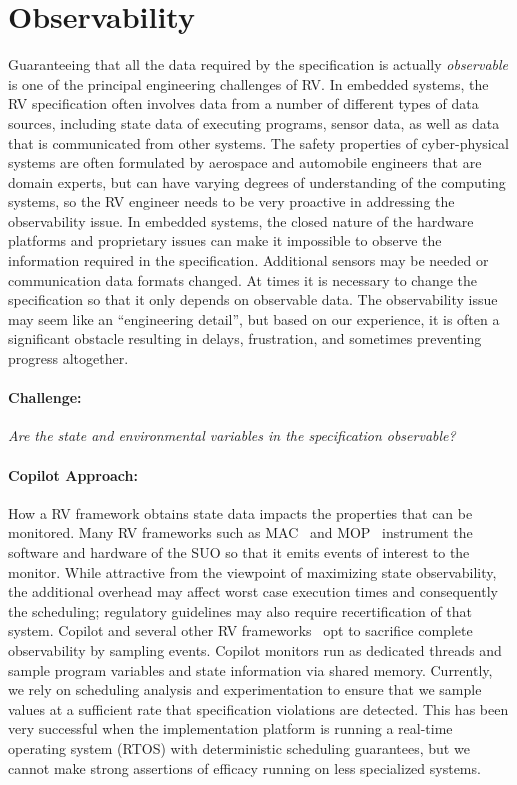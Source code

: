 \section{Observability}\label{sec:observ} 
Guaranteeing that all the data required by the specification is
actually \emph{observable} is one of the principal engineering
challenges of RV. In embedded systems, the RV specification often
involves data from a number of different types of data sources,
including state data of executing programs, sensor data, as well as
data that is communicated from other systems.  The safety
properties of cyber-physical systems are often formulated by aerospace
and automobile engineers that are domain experts, but can have
varying degrees of understanding of the computing systems, so the RV
engineer needs to be very proactive in addressing the observability
issue. In embedded systems, the closed nature of the hardware
platforms and proprietary  issues can make it impossible to observe the
information required in the specification.  Additional sensors may be
needed or communication data formats changed.  At times it is
necessary to change the specification so that it only depends on
observable data.  The observability issue may seem like an
``engineering detail'', but based on our experience,  it is often a
significant obstacle resulting in  delays, frustration, and sometimes
preventing progress altogether.


\paragraph{Challenge:} \emph{Are the state and environmental variables in the
specification  observable?}  


  \paragraph{Copilot Approach:} How a RV framework obtains state data impacts the properties that
  can be monitored. Many RV frameworks such as MAC~\cite{KimLKS04}
  and MOP~\cite{ChenR05} instrument the software and hardware of the
  SUO so that it emits events of interest to the monitor.  While
  attractive from the viewpoint of maximizing state observability, the
  additional overhead may affect  worst case
  execution times and consequently the scheduling; 
  regulatory guidelines may  also require recertification of that system.
  Copilot and several other RV frameworks~\cite{sampling,Kane15,borzoo} opt to sacrifice complete
  observability by sampling events.  Copilot monitors run as dedicated
  threads and sample program variables and state information via shared
  memory.  Currently, we rely on scheduling analysis and experimentation to ensure that we sample values at a
  sufficient rate that specification violations are detected. This has
  been very successful when the implementation platform is running a
  real-time operating system (RTOS) with deterministic scheduling
  guarantees, but we cannot make strong assertions of efficacy running on less
  specialized systems.

